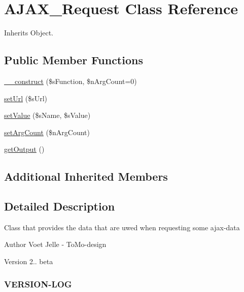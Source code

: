 \hypertarget{class_a_j_a_x___request}{\section{A\-J\-A\-X\-\_\-\-Request Class Reference}
\label{class_a_j_a_x___request}
}


Inherits Object.

\subsection*{Public Member Functions}
\begin{DoxyCompactItemize}
\item 
\hyperlink{class_a_j_a_x___request_ac2740cb109bab254475f45cde36a7c51}{\-\_\-\-\_\-construct} (\$s\-Function, \$n\-Arg\-Count=0)
\item 
\hyperlink{class_a_j_a_x___request_a46eda702ebc8b0c5b40582faa54d4430}{set\-Url} (\$s\-Url)
\item 
\hyperlink{class_a_j_a_x___request_a155a570af13c465ce28a1db0600a15ed}{set\-Value} (\$s\-Name, \$s\-Value)
\item 
\hyperlink{class_a_j_a_x___request_a18241531ebf16a4314b84e3e6c59b807}{set\-Arg\-Count} (\$n\-Arg\-Count)
\item 
\hyperlink{class_a_j_a_x___request_a56516da4748a2fb29e8043fa05727ff0}{get\-Output} ()
\end{DoxyCompactItemize}
\subsection*{Additional Inherited Members}


\subsection{Detailed Description}
Class that provides the data that are uwed when requesting some ajax-\/data

\begin{DoxyAuthor}{Author}
Voet Jelle -\/ To\-Mo-\/design 
\end{DoxyAuthor}
\begin{DoxyVersion}{Version}
2.. beta
\end{DoxyVersion}
\subsubsection*{V\-E\-R\-S\-I\-O\-N-\/\-L\-O\-G }

